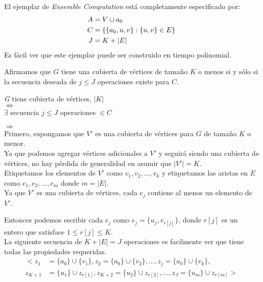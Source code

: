 \documentclass{beamer}
\begin{document}
\begin{frame}
    El ejemplar de \textit{Ensemble Computation} está completamente especificado por:
    \begin{align*}
    \huge A &= V \cup {a_0} \\
        C &= \{\{a_0,u,v\}: \{u,v\} \in E\} \\
        J &= K + |E|
    \end{align*}
    Es fácil ver que este ejemplar puede ser construido en tiempo polinomial.
\end{frame}

\begin{frame}
    Afirmamos que $G$ tiene una cubierta de vértices de tamaño $K$ o menos si y sólo si la secuencia deseada de $j \leq J$ operaciones existe para $C$.\\
    \begin{center}
        \huge \textit{G} tiene cubierta de vértices, $|K|$ \\ $\Leftrightarrow$ \\ $\exists$ secuencia $j \leq J$ operaciones $\in C$
    \end{center}
\end{frame}

\begin{frame}
    \underline{$\Rightarrow$} \\
    Primero, supongamos que $V'$ es una cubierta de vértices para $G$ de tamaño $K$ o menor. \\
    
    Ya que podemos agregar vértices adicionales a $V'$ y seguirá siendo una cubierta de vértices, no hay pérdida de generalidad en asumir que $|V'| = K$. \\
    
    Etiquetamos los elementos de $V'$ como $v_1, v_2, \dots, v_k$ y etiquetamos las aristas en $E$ como $e_1, e_2, \dots, e_m$ donde $m = |E|$. \\
    
    Ya que $V'$ es una cubierta de vértices, cada $e_j$ contiene al menos un elemento de $V'$. 
\end{frame}


\begin{frame}
    Entonces podemos escribir cada $e_j$ como $e_j = \{u_j, v_{r[j]}\}$, donde $r[j]$ es un entero que satisface $1 \leq r[j] \leq K$. \\
    
    La siguiente secuencia de $ K + |E| = J$ operaciones es facilmente ver que tiene todas las propiedades requeridas.
    \begin{align*}
        <z_1 &= \{a_0\} \cup \{v_1\}, z_2 = \{a_0\} \cup \{v_2\}, \dots, z_j = \{a_0\} \cup \{v_k\},\\
         z_{K+1} &= \{u_1\} \cup z_{r[1]}, z_{K+2} = \{u_2\} \cup z_{r[2]}, \dots, z_J = \{u_m\} \cup z_{r[m]}>
    \end{align*}
\end{frame}
\end{document}
